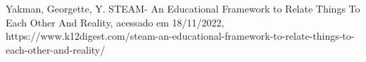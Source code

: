 \documentclass[
12pt,		%
openright,	%
twoside,  %
a4paper,			%
chapter=TITLE,		%
english,			%
french,				%
spanish,			%
brazil				%
]{USPSC-classe/USPSC}
\begin{document}
\begin{flushleft}
\begin{flushleft}
\begin{flushleft}
\begin{flushleft}
\begin{flushleft}
\begin{flushleft}
\begin{flushleft}
\begin{flushleft}
\begin{flushleft}
\begin{flushleft}
\begin{flushleft}
\begin{flushleft}
\begin{flushleft}
\begin{flushleft}
\begin{flushleft}
\begin{flushleft}
\begin{flushleft}
[YAKMAN, 2019] Yakman, Georgette, Y. STEAM- An Educational Framework to Relate Things To Each Other And Reality, acessado em 18/11/2022, https://www.k12digest.com/steam-an-educational-framework-to-relate-things-to-each-other-and-reality/
\end{flushleft}


\end{flushleft}


\end{flushleft}


\end{flushleft}


\end{flushleft}


\end{flushleft}


\end{flushleft}


\end{flushleft}


\end{flushleft}


\end{flushleft}


\end{flushleft}


\end{flushleft}


\end{flushleft}


\end{flushleft}


\end{flushleft}


\end{flushleft}


\end{flushleft}
\end{document}

